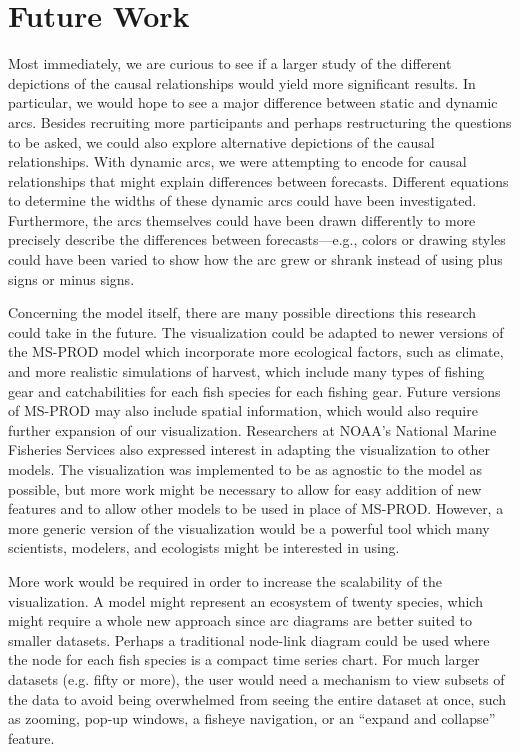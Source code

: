 \section{Future Work}

Most immediately, we are curious to see if a larger study of the different depictions of the causal relationships would yield more significant results.  In particular, we would hope to see a major difference between static and dynamic arcs.  Besides recruiting more participants and perhaps restructuring the questions to be asked, we could also explore alternative depictions of the causal relationships.  With dynamic arcs, we were attempting to encode for causal relationships that might explain differences between forecasts.  Different equations to determine the widths of these dynamic arcs could have been investigated.  Furthermore, the arcs themselves could have been drawn differently to more precisely describe the differences between forecasts---e.g., colors or drawing styles could have been varied to show how the arc grew or shrank instead of using plus signs or minus signs.

Concerning the model itself, there are many possible directions this research could take in the future.  The visualization could be adapted to newer versions of the MS-PROD model which incorporate more ecological factors, such as climate, and more realistic simulations of harvest, which include many types of fishing gear and catchabilities for each fish species for each fishing gear.  Future versions of MS-PROD may also include spatial information, which would also require further expansion of our visualization.  Researchers at NOAA's National Marine Fisheries Services also expressed interest in adapting the visualization to other models.  The visualization was implemented to be as agnostic to the model as possible, but more work might be necessary to allow for easy addition of new features and to allow other models to be used in place of MS-PROD.  However, a more generic version of the visualization would be a powerful tool which many scientists, modelers, and ecologists might be interested in using.

More work would be required in order to increase the scalability of the visualization.  A model might represent an ecosystem of twenty species, which might require a whole new approach since arc diagrams are better suited to smaller datasets.  Perhaps a traditional node-link diagram could be used where the node for each fish species is a compact time series chart.  For much larger datasets (e.g. fifty or more), the user would need a mechanism to view subsets of the data to avoid being overwhelmed from seeing the entire dataset at once, such as zooming, pop-up windows, a fisheye navigation, or an ``expand and collapse'' feature.

